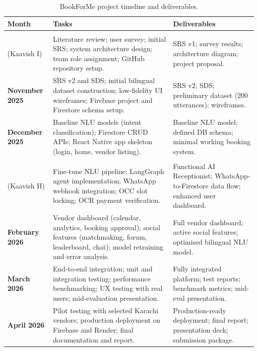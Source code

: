 \begin{table}[H]
\centering
\footnotesize
\caption{BookForMe project timeline and deliverables.}
\label{tab:gantt}
\setlength{\tabcolsep}{4pt}
\begin{tabularx}{\textwidth}{|l|X|X|}
\hline
\textbf{Month} & \textbf{Tasks} & \textbf{Deliverables} \\
\hline
\shortstack[l]{\textbf{Sep--Oct 2025}\\(Kaavish I)}
  & Literature review; user survey; initial SRS; system architecture design;
    team role assignment; GitHub repository setup.
  & SRS v1; survey results; architecture diagram; project proposal. \\
\hline
\textbf{November 2025}
  & SRS v2 and SDS; initial bilingual dataset construction; low-fidelity UI wireframes;
    Firebase project and Firestore schema setup.
  & SRS v2; SDS; preliminary dataset (200 utterances); wireframes. \\
\hline
\textbf{December 2025}
  & Baseline NLU models (intent classification); Firestore CRUD APIs;
    React Native app skeleton (login, home, vendor listing).
  & Baseline NLU model; defined DB schema; minimal working booking system. \\
\hline
\shortstack[l]{\textbf{January 2026}\\(Kaavish II)}
  & Fine-tune NLU pipeline; LangGraph agent implementation; WhatsApp webhook
    integration; OCC slot locking; OCR payment verification.
  & Functional AI Receptionist; WhatsApp-to-Firestore data flow; enhanced user dashboard. \\
\hline
\textbf{February 2026}
  & Vendor dashboard (calendar, analytics, booking approval); social features
    (matchmaking, forum, leaderboard, chat); model retraining and error analysis.
  & Full vendor dashboard; active social features; optimised bilingual NLU model. \\
\hline
\textbf{March 2026}
  & End-to-end integration; unit and integration testing; performance benchmarking;
    UX testing with real users; mid-evaluation presentation.
  & Fully integrated platform; test reports; benchmark metrics; mid-eval presentation. \\
\hline
\textbf{April 2026}
  & Pilot testing with selected Karachi vendors; production deployment on Firebase
    and Render; final documentation and report.
  & Production-ready deployment; final report; presentation deck; submission package. \\
\hline
\end{tabularx}
\end{table}


